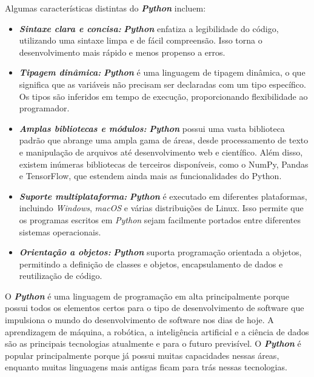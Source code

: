 \documentclass[a4paper, 12pt, onecolumn,singlespacing]{article}
\begin{document}
	Algumas características distintas do \textbf{\textit{Python}} incluem:
	\begin{itemize}
		\item 	\textbf{\textit{Sintaxe clara e concisa:}} \textbf{\textit{Python}} enfatiza a legibilidade do código, utilizando uma sintaxe limpa e de fácil compreensão. Isso torna o desenvolvimento mais rápido e menos propenso a erros.
		
		\item \textbf{\textit{Tipagem dinâmica:}} \textbf{\textit{Python}} é uma linguagem de tipagem dinâmica, o que significa que as variáveis não precisam ser declaradas com um tipo específico. Os tipos são inferidos em tempo de execução, proporcionando flexibilidade ao programador.
		
		\item \textbf{\textit{Amplas bibliotecas e módulos:}} \textbf{\textit{Python}} possui uma vasta biblioteca padrão que abrange uma ampla gama de áreas, desde processamento de texto e manipulação de arquivos até desenvolvimento web e científico. Além disso, existem inúmeras bibliotecas de terceiros disponíveis, como o NumPy, Pandas e TensorFlow, que estendem ainda mais as funcionalidades do Python.
		
		\item \textbf{\textit{Suporte multiplataforma:}} \textbf{\textit{Python}} é executado em diferentes plataformas, incluindo \textit{Windows}, \textit{macOS} e várias distribuições de Linux. Isso permite que os programas escritos em \textit{Python} sejam facilmente portados entre diferentes sistemas operacionais.
		
		\item \textbf{\textit{Orientação a objetos:}} \textbf{\textit{Python}} suporta programação orientada a objetos, permitindo a definição de classes e objetos, encapsulamento de dados e reutilização de código.
		
	\end{itemize}
	
	O \textbf{\textit{Python}} é uma linguagem de programação em alta principalmente porque possui todos os elementos certos para o tipo de desenvolvimento de software que impulsiona o mundo do desenvolvimento de software nos dias de hoje. A aprendizagem de máquina, a robótica, a inteligência artificial e a ciência de dados são as principais tecnologias atualmente e para o futuro previsível. O \textbf{\textit{Python}} é popular principalmente porque já possui muitas capacidades nessas áreas, enquanto muitas linguagens mais antigas ficam para trás nessas tecnologias.
	
\end{document}
